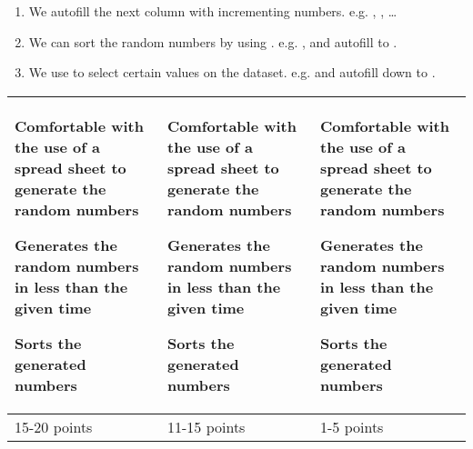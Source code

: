 \documentclass[answers, 12pt]{exam}
\begin{document}
\begin {questions}
\begin {solution}
\begin{enumerate}
    \item We autofill the next column with incrementing numbers. e.g. , , \ldots

    \item We can sort the random numbers by using . e.g. , and autofill to .

    \item We use  to select certain values on
      the dataset. e.g.  and autofill down
      to .

    \end {enumerate}
  \end {solution}
  \begin {solution}
    \begin{tabu} to 1\textwidth { | X[c] | X[c] | X[c] | }
      \hline
      \rowfont{\vspace{-1.2em} \color{red}}
      \begin{todolist}
      \item Comfortable with the use of a spread sheet to generate the random numbers
      \item Generates the random numbers in less than the given time
      \item Sorts the generated numbers
      \end {todolist} &
      \begin{todolist}
      \item Comfortable with the use of a spread sheet to generate the random numbers
      \item Generates the random numbers in less than the given time
      \item Sorts the generated numbers
      \end {todolist} &
      \begin{todolist}
      \item Comfortable with the use of a spread sheet to generate the random numbers
      \item Generates the random numbers in less than the given time
      \item Sorts the generated numbers
      \end {todolist} \\
      \hline
      \rowfont{\vspace{-0.6em} \color{red}} 15-20 points & 11-15 points & 1-5 points \\ 
      \hline
    \end{tabu}
  \end {solution}
\end {questions}
\end{document}
